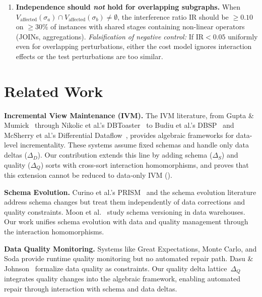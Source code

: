 \documentclass[11pt,a4paper]{article}
\theoremstyle{definition}
\newcommand{\DeltaS}{\Delta_{\!S}}
\newcommand{\DeltaD}{\Delta_{\!D}}
\newcommand{\DeltaQ}{\Delta_{\!Q}}
\begin{document}
\begin{enumerate}[label=\textbf{NC\arabic*},nosep,start=11]
  \item \textbf{Independence should \emph{not} hold for overlapping
    subgraphs.}
    When $V_{\mathrm{affected}}(\sigma_a) \cap V_{\mathrm{affected}}(\sigma_b)
    \neq \emptyset$, the interference ratio $\mathrm{IR}$ should be
    $\geq 0.10$ on $\geq$30\% of instances with shared stages containing
    non-linear operators (JOINs, aggregations).
    \emph{Falsification of negative control:}  If $\mathrm{IR} < 0.05$
    uniformly even for overlapping perturbations, either the cost model
    ignores interaction effects or the test perturbations are too similar.
\end{enumerate}



\section{Related Work}
\label{sec:related}

\textbf{Incremental View Maintenance (IVM).}
The IVM literature, from Gupta \& Mumick~\cite{gupta1995maintenance} through
Nikolic et al.'s DBToaster~\cite{nikolic2018incremental} to Budiu et al.'s
DBSP~\cite{budiu2023dbsp} and McSherry et al.'s Differential
Dataflow~\cite{mcsherry2013differential}, provides algebraic frameworks for
data-level incrementality.  These systems assume fixed schemas and handle only
data deltas ($\DeltaD$).  Our contribution extends this line by adding schema
($\DeltaS$) and quality ($\DeltaQ$) sorts with cross-sort interaction
homomorphisms, and proves that this extension cannot be reduced to data-only
IVM ().

\textbf{Schema Evolution.}
Curino et al.'s PRISM~\cite{curino2008schema} and the schema evolution
literature address schema changes but treat them independently of data
corrections and quality constraints.  Moon et al.~\cite{moon2010managing}
study schema versioning in data warehouses.  Our work unifies schema evolution
with data and quality management through the interaction homomorphisms.

\textbf{Data Quality Monitoring.}
Systems like Great Expectations, Monte Carlo, and Soda provide runtime quality
monitoring but no automated repair path.  Dasu \& Johnson~\cite{dasu2003data}
formalize data quality as constraints.  Our quality delta lattice~$\DeltaQ$
integrates quality changes into the algebraic framework, enabling automated
repair through interaction with schema and data deltas.
\end{document}

